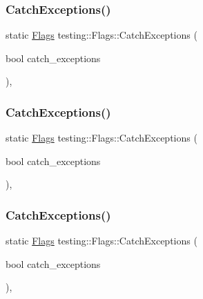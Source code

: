 \mbox{\label{structtesting_1_1_flags_a2c7d89f62f4328ae0ced66154ef96b44}} 
\subsubsection{\texorpdfstring{CatchExceptions()}{CatchExceptions()}\hspace{0.1cm}{\footnotesize\ttfamily [1/3]}}
{\footnotesize\ttfamily static \mbox{\hyperlink{structtesting_1_1_flags}{Flags}} testing\+::\+Flags\+::\+Catch\+Exceptions (\begin{DoxyParamCaption}\item[{bool}]{catch\+\_\+exceptions }\end{DoxyParamCaption})\hspace{0.3cm}{\ttfamily [inline]}, {\ttfamily [static]}}

\mbox{\label{structtesting_1_1_flags_a2c7d89f62f4328ae0ced66154ef96b44}} 
\subsubsection{\texorpdfstring{CatchExceptions()}{CatchExceptions()}\hspace{0.1cm}{\footnotesize\ttfamily [2/3]}}
{\footnotesize\ttfamily static \mbox{\hyperlink{structtesting_1_1_flags}{Flags}} testing\+::\+Flags\+::\+Catch\+Exceptions (\begin{DoxyParamCaption}\item[{bool}]{catch\+\_\+exceptions }\end{DoxyParamCaption})\hspace{0.3cm}{\ttfamily [inline]}, {\ttfamily [static]}}

\mbox{\label{structtesting_1_1_flags_a2c7d89f62f4328ae0ced66154ef96b44}} 
\subsubsection{\texorpdfstring{CatchExceptions()}{CatchExceptions()}\hspace{0.1cm}{\footnotesize\ttfamily [3/3]}}
{\footnotesize\ttfamily static \mbox{\hyperlink{structtesting_1_1_flags}{Flags}} testing\+::\+Flags\+::\+Catch\+Exceptions (\begin{DoxyParamCaption}\item[{bool}]{catch\+\_\+exceptions }\end{DoxyParamCaption})\hspace{0.3cm}{\ttfamily [inline]}, {\ttfamily [static]}}

